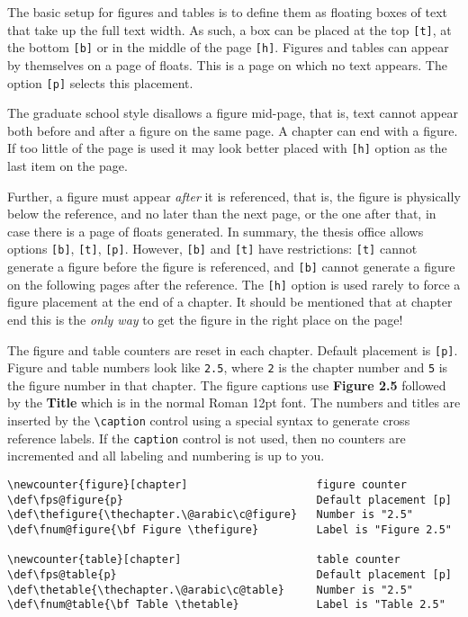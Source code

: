 The basic setup for figures and tables is to define them as floating
boxes of text that take up the full text width. As such, a box can be
placed at the top \verb"[t]", at the bottom \verb"[b]" or in the middle
of the page \verb"[h]". Figures and tables can appear by themselves on a
page of floats. This is a page on which no text appears. The option
\verb"[p]" selects this placement.

The graduate school style disallows a figure mid-page, that is, text
cannot appear both before and after a figure on the same page.
A chapter can end with a figure. If too little of the page is used it
may look better placed with \verb"[h]" option as the last item on the
page.

Further, a figure must appear {\em after} it is referenced, that is, the
figure is physically below the reference, and no later than the next
page, or the one after that, in case there is a page of floats
generated. In summary, the thesis office allows options \verb"[b]",
\verb"[t]", \verb"[p]". However, \verb"[b]" and \verb"[t]" have
restrictions: \verb"[t]" cannot generate a figure before the figure is
referenced, and \verb"[b]" cannot generate a figure on the following
pages after the reference. The \verb"[h]" option is used rarely to force
a figure placement at the end of a chapter. It should be mentioned that
at chapter end this is the {\em only way} to get the figure in the
right place on the page!

The figure and table counters are reset in each chapter. Default
placement is \verb"[p]". Figure and table numbers look like {\tt 2.5},
where {\tt 2} is the chapter number and {\tt 5} is the figure number in
that chapter. The figure captions use {\bf Figure 2.5} followed by the
{\bf Title} which is in the normal Roman 12pt font. The numbers and
titles are inserted by the \verb"\caption" control using a special
syntax to generate cross reference labels. If the {\tt caption} control
is not used, then no counters are incremented and all labeling and
numbering is up to you.

\footnotesize\begin{verbatim}
\newcounter{figure}[chapter]                    figure counter
\def\fps@figure{p}                              Default placement [p]
\def\thefigure{\thechapter.\@arabic\c@figure}   Number is "2.5"
\def\fnum@figure{\bf Figure \thefigure}         Label is "Figure 2.5"

\newcounter{table}[chapter]                     table counter
\def\fps@table{p}                               Default placement [p]
\def\thetable{\thechapter.\@arabic\c@table}     Number is "2.5"
\def\fnum@table{\bf Table \thetable}            Label is "Table 2.5"
\end{verbatim}\normalsize

